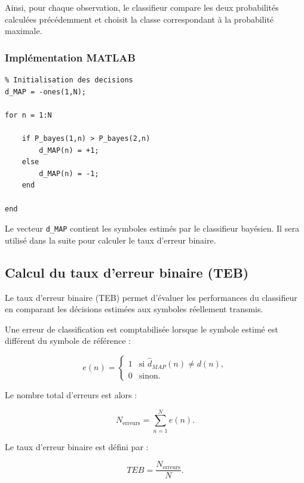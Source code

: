 Ainsi, pour chaque observation, le classifieur compare
les deux probabilités calculées précédemment et choisit
la classe correspondant à la probabilité maximale.

\subsubsection{Implémentation MATLAB}

\begin{verbatim}
% Initialisation des decisions
d_MAP = -ones(1,N);

for n = 1:N

    if P_bayes(1,n) > P_bayes(2,n)
        d_MAP(n) = +1;
    else
        d_MAP(n) = -1;
    end

end
\end{verbatim}

Le vecteur \texttt{d\_MAP} contient les symboles estimés
par le classifieur bayésien. Il sera utilisé dans la
suite pour calculer le taux d'erreur binaire.

\subsection{Calcul du taux d'erreur binaire (TEB)}

Le taux d'erreur binaire (TEB) permet d'évaluer les
performances du classifieur en comparant les décisions
estimées aux symboles réellement transmis.

Une erreur de classification est comptabilisée lorsque
le symbole estimé est différent du symbole de référence :

\begin{equation}
e(n)=
\begin{cases}
1 & \text{si } \widehat{d}_{MAP}(n)\neq d(n),\\
0 & \text{sinon}.
\end{cases}
\end{equation}

Le nombre total d'erreurs est alors :

\begin{equation}
N_{\mathrm{erreurs}}=
\sum_{n=1}^{N}e(n).
\end{equation}

Le taux d'erreur binaire est défini par :

\begin{equation}
\boxed{
TEB=\frac{N_{\mathrm{erreurs}}}{N}.
}
\end{equation}

